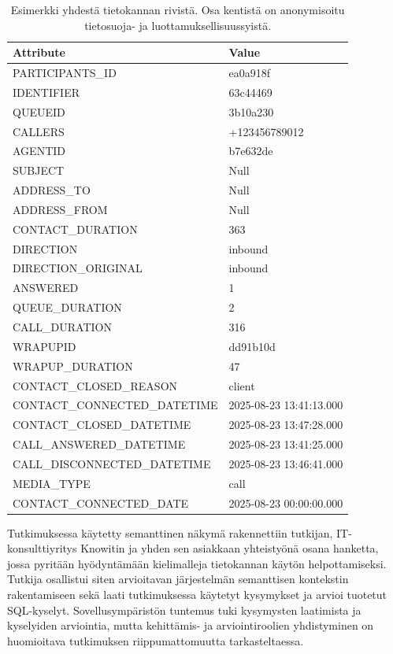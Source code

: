 \begin{table}[ht]
  \centering
  \small
  \begin{tabularx}{0.8\textwidth}{l X}
    \toprule
    \textbf{Attribute} & \textbf{Value} \\
    \midrule
    PARTICIPANTS\_ID & ea0a918f \\
    IDENTIFIER & 63c44469 \\
    QUEUEID & 3b10a230 \\
    CALLERS & +123456789012 \\
    AGENTID & b7e632de \\
    SUBJECT & Null \\
    ADDRESS\_TO & Null \\
    ADDRESS\_FROM & Null \\
    CONTACT\_DURATION & 363 \\
    DIRECTION & inbound \\
    DIRECTION\_ORIGINAL & inbound \\
    ANSWERED & 1 \\
    QUEUE\_DURATION & 2 \\
    CALL\_DURATION & 316 \\
    WRAPUPID & dd91b10d \\
    WRAPUP\_DURATION & 47 \\
    CONTACT\_CLOSED\_REASON & client \\
    CONTACT\_CONNECTED\_DATETIME & 2025-08-23 13:41:13.000 \\
    CONTACT\_CLOSED\_DATETIME & 2025-08-23 13:47:28.000 \\
    CALL\_ANSWERED\_DATETIME & 2025-08-23 13:41:25.000 \\
    CALL\_DISCONNECTED\_DATETIME & 2025-08-23 13:46:41.000 \\
    MEDIA\_TYPE & call \\
    CONTACT\_CONNECTED\_DATE & 2025-08-23 00:00:00.000 \\
    \bottomrule
  \end{tabularx}
  \caption{Esimerkki yhdestä tietokannan rivistä. Osa kentistä on anonymisoitu tietosuoja- ja luottamuksellisuussyistä.}
  \label{tb:example_record}
\end{table}

Tutkimuksessa käytetty semanttinen näkymä rakennettiin tutkijan,
IT-konsultti\-yritys Knowitin ja yhden sen asiakkaan yhteistyönä osana
hanketta, jossa pyritään hyödyntämään kielimalleja tietokannan käytön
helpottamiseksi. Tutkija osallistui siten arvioitavan järjestelmän
semanttisen kontekstin rakentamiseen sekä laati tutkimuksessa käytetyt
kysymykset ja arvioi tuotetut SQL-kyselyt. Sovellusympäristön tuntemus
tuki kysymysten laatimista ja kyselyiden arviointia, mutta kehittämis-
ja arviointiroolien yhdistyminen on huomioitava tutkimuksen
riippumattomuutta tarkasteltaessa.

